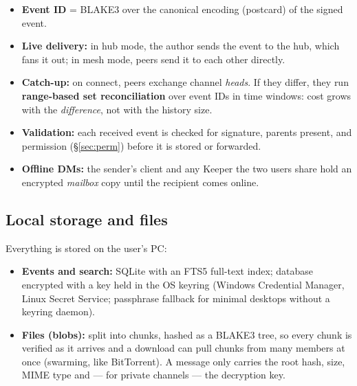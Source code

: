 \documentclass[11pt,a4paper]{article}
\begin{document}
\begin{itemize}
  \item \textbf{Event ID} = BLAKE3 over the canonical encoding (postcard) of the signed event.
  \item \textbf{Live delivery:} in hub mode, the author sends the event to the hub, which
        fans it out; in mesh mode, peers send it to each other directly.
  \item \textbf{Catch-up:} on connect, peers exchange channel \emph{heads}. If they differ,
        they run \textbf{range-based set reconciliation} over event IDs in time windows:
        cost grows with the \emph{difference}, not with the history size.
  \item \textbf{Validation:} each received event is checked for signature, parents present,
        and permission (\S\ref{sec:perm}) before it is stored or forwarded.
  \item \textbf{Offline DMs:} the sender's client and any Keeper the two users share hold an
        encrypted \emph{mailbox} copy until the recipient comes online.
\end{itemize}

\subsection{Local storage and files}
\label{sec:storage}

Everything is stored on the user's PC:
\begin{itemize}
  \item \textbf{Events and search:} SQLite with an FTS5 full-text index;
        database encrypted with a key held in the OS keyring
        (Windows Credential Manager, Linux Secret Service; passphrase fallback for
        minimal desktops without a keyring daemon).
  \item \textbf{Files (blobs):} split into chunks, hashed as a BLAKE3 tree, so every chunk
        is verified as it arrives and a download can pull chunks from many members at once
        (swarming, like BitTorrent). A message only carries the root hash, size, MIME type
        and --- for private channels --- the decryption key.
\end{itemize}
\end{document}
